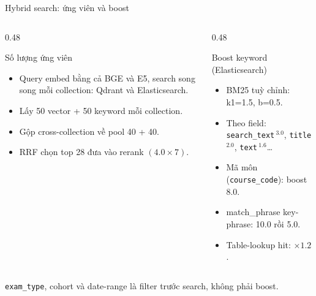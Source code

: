 \documentclass[t, aspectratio=169]{beamer}
\begin{document}
	\begin{frame}{Hybrid search: ứng viên và boost}
		\begin{columns}[T,onlytextwidth]
			\begin{column}{0.48\textwidth}
				\begin{block}{Số lượng ứng viên}
					\begin{itemize}
						\item Query embed bằng cả BGE và E5, search song song mỗi collection: Qdrant và Elasticsearch.
						\item Lấy 50 vector + 50 keyword mỗi collection.
						\item Gộp cross-collection về pool 40 + 40.
						\item RRF chọn top 28 đưa vào rerank $(4.0 \times 7)$.
					\end{itemize}
				\end{block}
			\end{column}
			\begin{column}{0.48\textwidth}
				\begin{block}{Boost keyword (Elasticsearch)}
					\scriptsize
					\begin{itemize}
						\item BM25 tuỳ chỉnh: k1=1.5, b=0.5.
						\item Theo field: \texttt{search\_text}\,$^{3.0}$, \texttt{title}\,$^{2.0}$, \texttt{text}\,$^{1.6}$\dots
						\item Mã môn (\texttt{course\_code}): boost 8.0.
						\item match\_phrase key-phrase: 10.0 rồi 5.0.
						\item Table-lookup hit: $\times 1.2$.
					\end{itemize}
				\end{block}
			\end{column}
		\end{columns}

		\vspace{0.1cm}
		\centering
		\scriptsize \texttt{exam\_type}, cohort và date-range là filter trước search, không phải boost.
	\end{frame}
\end{document}
